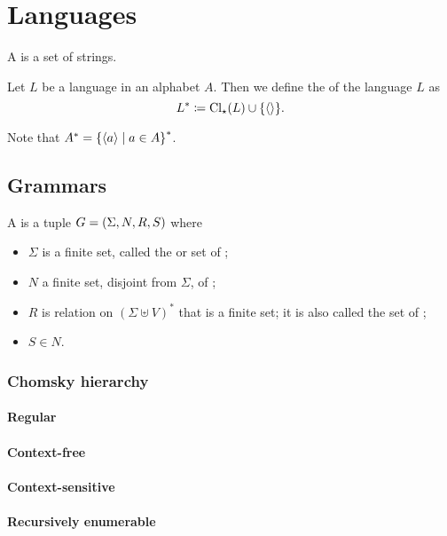 \chapter{Languages}
\begin{definition}
A  is a set of strings.
\end{definition}

\begin{definition}
Let $L$ be a language in an alphabet $A$. Then we define the  of the language $L$ as
\[ L^* \coloneqq \operatorname{Cl}_\star(L) \cup \{\left\langle  \right\rangle\}. \]
\end{definition}
Note that $A^* = \left\{ \left\langle a \right\rangle \;\middle|\; a\in A \right\}^*$.

\section{Grammars}
\begin{definition}
A  is a tuple $G = \left( \Sigma, N, R, S \right)$ where
\begin{itemize}
\item $\Sigma$ is a finite set, called the  or set of ;
\item $N$ a finite set, disjoint from $\Sigma$, of ;
\item $R$ is relation on $(\Sigma \uplus V)^*$ that is a finite set; it is also called the set of ;
\item $S\in N$.
\end{itemize}
\end{definition}

\subsection{Chomsky hierarchy}
\subsubsection{Regular}
\subsubsection{Context-free}
\subsubsection{Context-sensitive}
\subsubsection{Recursively enumerable}


